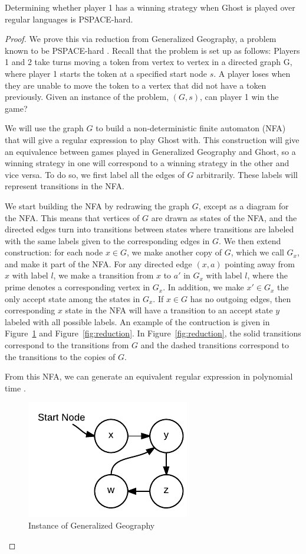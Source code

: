 \documentclass[runningheads,a4paper]{llncs}
\begin{document}
\begin{theorem} Determining whether player 1 has a winning strategy when Ghost is played over regular languages is PSPACE-hard.
\end{theorem}
\begin{proof} We prove this via reduction from Generalized Geography, a problem known to be PSPACE-hard \cite{theoryofcomp}. Recall that the problem is set up as follows:
Players 1 and 2 take turns moving a token from vertex to vertex in a directed graph G, where player 1 starts the token at a specified start node $s$. A player loses when they are unable to move the token to a vertex that did not have a token previously. Given an instance of the problem, $(G,s)$, can player 1 win the game?

We will use the graph $G$ to build a non-deterministic finite automaton (NFA) that will give a regular expression to play Ghost with. This construction will give an equivalence between games played in Generalized Geography and Ghost, so a winning strategy in one will correspond to a winning strategy in the other and vice versa. To do so, we first label all the edges of $G$ arbitrarily. These labels will represent transitions in the NFA.

We start building the NFA by redrawing the graph $G$, except as a diagram for the NFA. This means that vertices of $G$ are drawn as states of the NFA, and the directed edges turn into transitions between states where transitions are labeled with the same labels given to the corresponding edges in $G$. We then extend construction: for each node $x\in G$, we make another copy of $G$, which we call $G_x$, and make it part of the NFA. For any directed edge $(x,a)$ pointing away from $x$ with label $l$, we make a transition from $x$ to $a'$ in $G_x$ with label $l$, where the prime denotes a corresponding vertex in $G_x$. In addition, we make $x' \in G_x$  the only accept state among the states in $G_x$. If $x\in G$ has no outgoing edges, then corresponding $x$ state in the NFA will have a transition to an accept state $y$ labeled with all possible labels. An example of the contruction is given in Figure~\ref{fig:instance} and Figure~\ref{fig:reduction}. In Figure~\ref{fig:reduction}, the solid transitions correspond to the transitions from $G$ and the dashed transitions correspond to the transitions to the copies of $G$.

From this NFA, we can generate an equivalent regular expression in polynomial time \cite{theoryofcomp}.
\begin{figure}
\centering
\includegraphics[width=0.3\linewidth]{Ghost1.pdf}
\caption{Instance of Generalized Geography}
\label{fig:instance}
\end{figure}


\end{proof}
\end{document}
